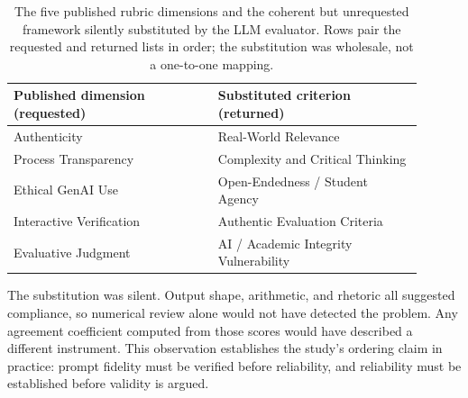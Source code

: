 \documentclass[sigconf]{acmart}
\begin{document}
\begin{table}[t]
\caption{The five published rubric dimensions and the coherent but unrequested framework silently substituted by the LLM evaluator. Rows pair the requested and returned lists in order; the substitution was wholesale, not a one-to-one mapping.}
\label{tab:drift}
\begin{tabular}{@{}p{0.45\linewidth}p{0.45\linewidth}@{}}
\toprule
Published dimension (requested) & Substituted criterion (returned) \\
\midrule
Authenticity & Real-World Relevance \\
Process Transparency & Complexity and Critical Thinking \\
Ethical GenAI Use & Open-Endedness / Student Agency \\
Interactive Verification & Authentic Evaluation Criteria \\
Evaluative Judgment & AI / Academic Integrity Vulnerability \\
\bottomrule
\end{tabular}
\end{table}

The substitution was silent. Output shape, arithmetic, and rhetoric all suggested compliance, so numerical review alone would not have detected the problem. Any agreement coefficient computed from those scores would have described a different instrument. This observation establishes the study's ordering claim in practice: prompt fidelity must be verified before reliability, and reliability must be established before validity is argued.
\end{document}
